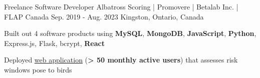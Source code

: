 \begin{cventries}
  \cventry
    {Freelance Software Developer} %
    {Albatross Scoring | Promovere | Betalab Inc. | FLAP Canada} %
    {Sep. 2019 - Aug. 2023} %
    {Kingston, Ontario, Canada} %
    {
      \begin{cvitems} %
        \item{Built out 4 software products using \textbf{MySQL}, \textbf{MongoDB}, \textbf{JavaScript}, \textbf{Python}, Express.js, Flask, bcrypt, \textbf{React}}
        \item{Deployed \href{https://www.flapapp.ca/}{web application} (\textbf{> 50 monthly active users}) that assesses risk windows pose to birds}
      \end{cvitems}
    }


\end{cventries}
